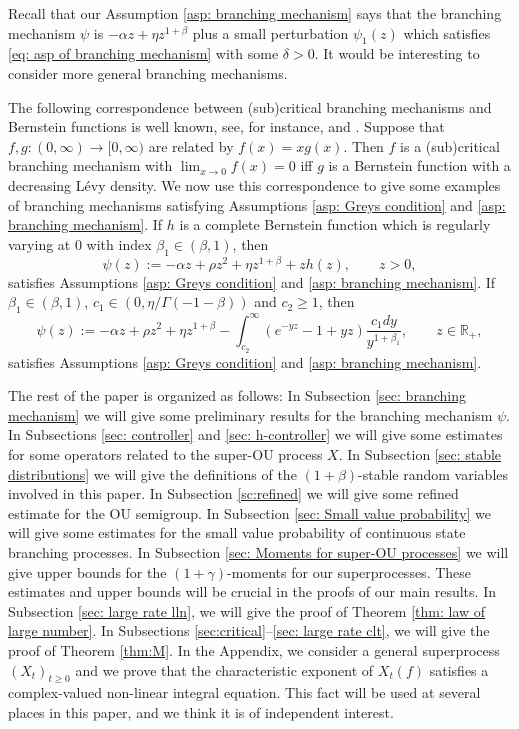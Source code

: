 \documentclass[EJP]{ejpecp} %
\begin{document}
Recall that our Assumption \ref{asp: branching mechanism} says that the branching mechanism $\psi$ is $-\alpha z +\eta z^{1+\beta}$ plus a small perturbation
$\psi_1(z)$
which satisfies \eqref{eq: asp of branching mechanism} with some $\delta>0$.
It would be interesting to consider more general branching mechanisms.

The following correspondence between (sub)critical branching mechanisms and Bernstein functions is well known, see, for instance,
\cite[Theorem VII.4(ii)]{Bertoin} and \cite[Proposition 7]{BRY}. Suppose that $f, g:(0, \infty)\to [0, \infty)$ are related by $f(x)=xg(x)$.
Then $f$ is a (sub)critical branching mechanism with $\lim_{x\to 0}f(x)=0$ iff $g$ is a Bernstein function with a decreasing L\'evy density.
We now use this correspondence to give some examples of branching mechanisms satisfying Assumptions \ref{asp: Greys condition} and \ref{asp: branching mechanism}.
If $h$ is a complete Bernstein function which is regularly varying at 0 with index $\beta_1\in (\beta, 1)$, then
\[
  \psi(z)
  := -\alpha z + \rho z^2+\eta z^{1+\beta}+zh(z)
  , \qquad z>0,
\]
satisfies Assumptions \ref{asp: Greys condition} and \ref{asp: branching mechanism}.
If $\beta_1\in (\beta, 1)$, $c_1\in (0, \eta/\Gamma(-1-\beta))$ and $c_2\ge 1$, then
\[
  \psi(z)
  :=-\alpha z + \rho z^2+\eta z^{1+\beta}-\int^\infty_{c_2} (e^{-yz}-1+yz)\frac{c_1dy}{y^{1+\beta_1}}
  , \qquad z\in \mathbb R_+,
\]
satisfies Assumptions \ref{asp: Greys condition} and \ref{asp: branching mechanism}.

The rest of the paper is organized as follows:
In Subsection \ref{sec: branching mechanism} we will give some preliminary results for the branching mechanism $\psi$.
In Subsections \ref{sec: controller} and \ref{sec: h-controller} we will give some estimates for some operators related to the super-OU process $X$.
In Subsection \ref{sec: stable distributions} we will give the definitions of the $(1+\beta)$-stable random variables involved in this paper.
In Subsection \ref{sc:refined} we will give some refined estimate for the OU semigroup.
In Subsection \ref{sec: Small value probability} we will give some estimates for the small value probability of continuous state branching processes.
In Subsection \ref{sec: Moments for super-OU processes} we will give upper bounds for the $(1+\gamma)$-moments for our superprocesses.
These estimates and upper bounds will be crucial in the proofs of our main results.
In Subsection \ref{sec: large rate lln}, we will give the proof of Theorem \ref{thm: law of large number}.
In Subsections \ref{sec:critical}--\ref{sec: large rate clt}, we will give the proof of Theorem \ref{thm:M}.
In the Appendix, we consider a general superprocess $(X_t)_{t\geq 0}$ and we prove that the characteristic exponent of $X_t(f)$ satisfies a complex-valued non-linear integral equation.
This fact will be used at several places in this paper, and we think it is of independent interest.
\end{document}

